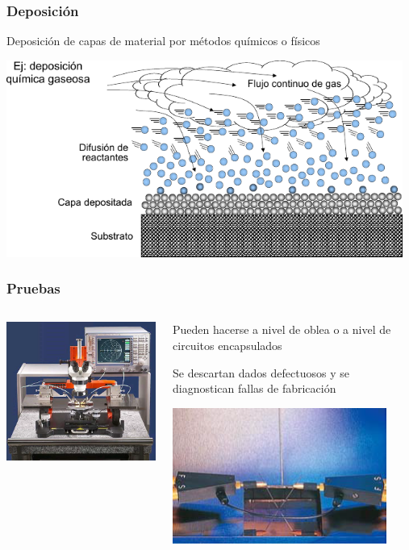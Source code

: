 \documentclass[aspectratio=169,10pt]{beamer}
\begin{document}
\begin{frame}
\frametitle{Deposición}
Deposición de capas de material por métodos químicos o físicos

\vspace{4mm}
\centering
\includegraphics[width=13cm]{CVD}
\end{frame}


\begin{frame}
\frametitle{Pruebas}
\begin{columns}
\begin{column}{0.5\textwidth}
	\centering
	\includegraphics[width=7cm]{probestation}
\end{column}
\begin{column}{0.5\textwidth}
	\centering
	Pueden hacerse a nivel de oblea o a nivel de circuitos encapsulados
	
	\vspace{3mm}
	Se descartan dados defectuosos y se diagnostican fallas de fabricación
	
	\vspace{5mm}
	\includegraphics[width=7cm]{probeheads}
\end{column}

\end{columns}
\end{frame}
\end{document}
